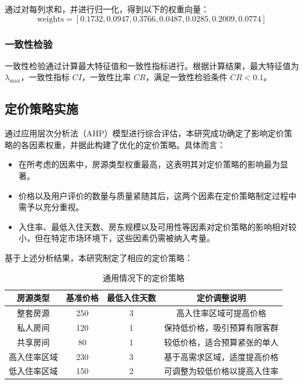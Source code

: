 \documentclass[12pt]{article}
\begin{document}
\begin{CJK}{UTF8}{gbsn}
	
	
	通过对每列求和，并进行归一化，得到以下的权重向量：
	\begin{equation}
		\text{weights} = \left[ 0.1732, 0.0947, 0.3766, 0.0487, 0.0285, 0.2009, 0.0774 \right]
	\end{equation}
	
	\subsubsection{一致性检验}
	一致性检验通过计算最大特征值和一致性指标进行。根据计算结果，最大特征值为 $\lambda_{\max}$，一致性指标 $CI$，一致性比率 $CR$，满足一致性检验条件 $CR < 0.1$。
	
	\subsection{定价策略实施}
	通过应用层次分析法（AHP）模型进行综合评估，本研究成功确定了影响定价策略的各因素权重，并据此构建了优化的定价策略。具体而言：
	
	\begin{itemize}
		\item 在所考虑的因素中，房源类型权重最高，这表明其对定价策略的影响最为显著。
		\item 价格以及用户评价的数量与质量紧随其后，这两个因素在定价策略制定过程中需予以充分重视。
		\item 入住率、最低入住天数、房东规模以及可用性等因素对定价策略的影响相对较小，但在特定市场环境下，这些因素仍需被纳入考量。
	\end{itemize}
	
	基于上述分析结果，本研究制定了相应的定价策略：
	
	\begin{table}[htbp]
		\centering
		\caption{通用情况下的定价策略}
		\begin{tabular}{cccc}  %
			\toprule
			房源类型 & 基准价格 & 最低入住天数 & 定价调整说明 \\
			\midrule
			整套房源 & 250 & 3 & 高入住率区域可提高价格 \\
			私人房间 & 120 & 1 & 保持低价格，吸引预算有限客群 \\
			共享房间 & 80 & 1 & 较低价格，适合预算紧张的单人 \\
			高入住率区域 & 230 & 3 & 基于高需求区域，适度提高价格 \\
			低入住率区域 & 150 & 2 & 可调整为较低价格以提高入住率 \\
			\bottomrule
		\end{tabular}
	\end{table}
	

\end{CJK}
\end{document}
